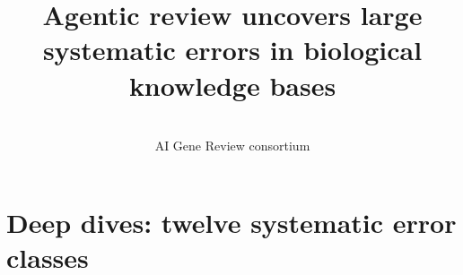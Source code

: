 \documentclass[11pt]{article}
\title{Agentic review uncovers large systematic errors in biological knowledge bases}
\author{\todo{authors} \\ \small AI Gene Review consortium \todo{affiliations}}
\date{\todo{date}}
\begin{document}
\maketitle



\section{Deep dives: twelve systematic error classes}\label{sec:deepdives}



















\appendix

\end{document}
